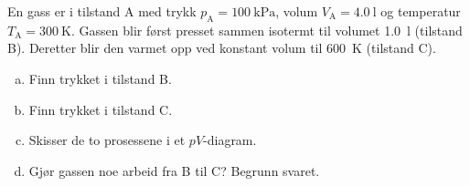 %
En gass er i tilstand A med trykk $p_\text{A} = \SI{100}{\kilo\pascal}$, volum $V_\text{A} = \SI{4.0}{\litre}$ og temperatur $T_\text{A} = \SI{300}{\kelvin}$. Gassen blir først presset sammen isotermt til volumet \SI{1.0}{\litre} (tilstand B). Deretter blir den varmet opp ved konstant volum til \SI{600}{\kelvin} (tilstand C).
\begin{enumerate}[a)]
    \item Finn trykket i tilstand B.
    \item Finn trykket i tilstand C.
    \item Skisser de to prosessene i et $pV$-diagram.
    \item Gjør gassen noe arbeid fra B til C? Begrunn svaret.
\end{enumerate}
%
